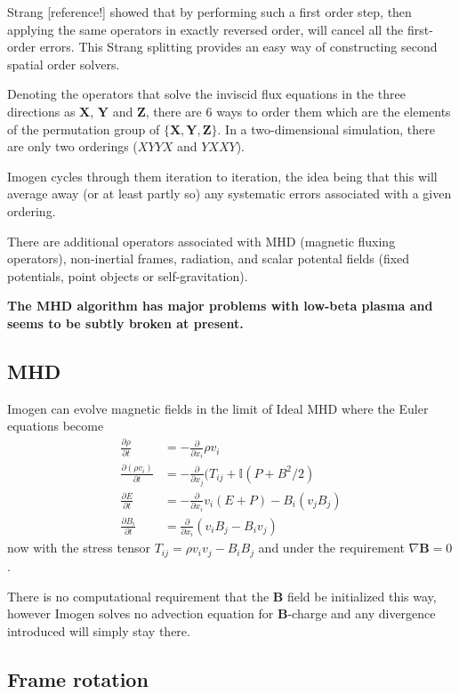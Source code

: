 \documentclass[letterpaper,12pt]{article}
\begin{document}
Strang [reference!] showed that by performing such a first order step, then
applying the same operators in exactly reversed order, will cancel all the first-order
errors. This Strang splitting provides an easy way of constructing second spatial order
solvers.

Denoting the operators that solve the inviscid flux equations in the three directions as
$\mathbf{X}$, $\mathbf{Y}$ and $\mathbf{Z}$, there are 6 ways to order them which are the
elements of the permutation group of $\{ \mathbf{X}, \mathbf{Y}, \mathbf{Z} \}$.
In a two-dimensional simulation, there are only two orderings ($XYYX$ and $YXXY$).

Imogen cycles through them iteration to iteration, the idea being that this will average
away (or at least partly so) any systematic errors associated with a given ordering.

There are additional operators associated with MHD (magnetic fluxing operators), non-inertial
frames, radiation, and scalar potental fields (fixed potentials, point objects or
self-gravitation).

\textbf{The MHD algorithm has major problems with low-beta plasma and seems to be
subtly broken at present.}

\subsection{MHD}

Imogen can evolve magnetic fields in the limit of Ideal MHD where the Euler equations
become
\begin{align*}
\frac{\partial \rho}{\partial t} &= -\frac{\partial}{\partial x_i} \rho v_i \\
\frac{\partial (\rho v_i)}{\partial t} &= -\frac{\partial}{\partial x_j} (T_{ij} + \mathbb{I}(P+B^2/2) \\
\frac{\partial E}{\partial t} &= -\frac{\partial}{\partial x_i} v_i (E + P) - B_i (v_j B_j) \\
\frac{\partial B_i}{\partial t} &= \frac{\partial}{\partial x_i} (v_i B_j - B_i v_j)
\end{align*}
now with the stress tensor $T_{ij} = \rho v_i v_j - B_i B_j$ and under the requirement
$\nabla \mathbf{B} = 0$.

There is no computational requirement that the \textbf{B} field be initialized this way,
however Imogen solves no advection equation for $\mathbf{B}$-charge and any divergence
introduced will simply stay there.

\subsection{Frame rotation}
\end{document}
